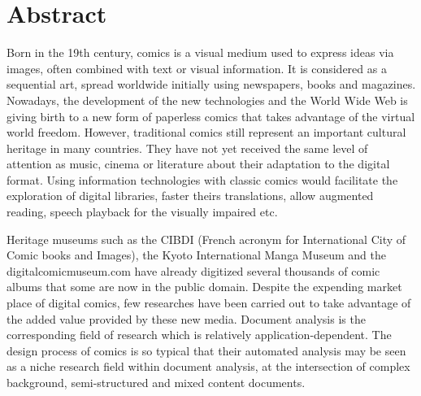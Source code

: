 \chapter*{Abstract}


Born in the 19th century, comics is a visual medium used to express ideas via images, often combined with text or visual information.
It is considered as a sequential art, spread worldwide initially using newspapers, books and magazines.
Nowadays, the development of the new technologies and the World Wide Web is giving birth to a new form of paperless comics that takes advantage of the virtual world freedom.
However, traditional comics still represent an important cultural heritage in many countries.
They have not yet received the same level of attention as music, cinema or literature about their adaptation to the digital format.
Using information technologies with classic comics would facilitate the exploration of digital libraries, faster theirs translations, allow augmented reading, speech playback for the visually impaired etc.

Heritage museums such as the CIBDI (French acronym for International City of Comic books and Images), the Kyoto International Manga Museum and the digitalcomicmuseum.com have already digitized several thousands of comic albums that some are now in the public domain.
Despite the expending market place of digital comics, few researches have been carried out to take advantage of the added value provided by these new media.
Document analysis is the corresponding field of research which is relatively application-dependent.
The design process of comics is so typical that their automated analysis may be seen as a niche research field within document analysis, at the intersection of complex background, semi-structured and mixed content documents.

